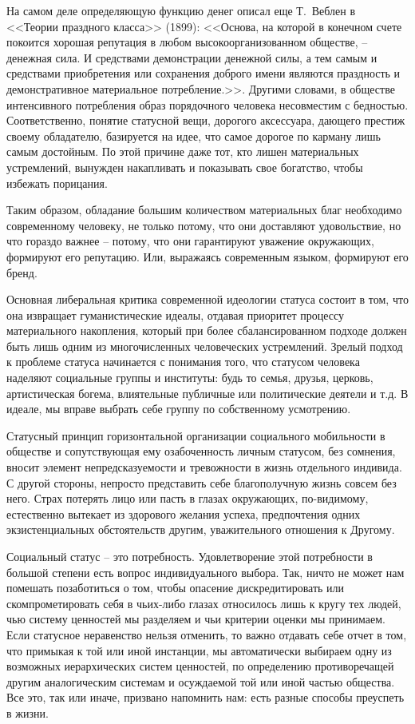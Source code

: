 На самом деле определяющую функцию денег описал еще Т.~Веблен в <<Теории
праздного класса>> (1899): <<Основа, на которой в конечном счете покоится
хорошая репутация в любом высокоорганизованном обществе, -- денежная сила.
И средствами демонстрации денежной силы, а тем самым и средствами приобретения
или сохранения доброго имени являются праздность и демонстративное материальное
потребление.>>\autocite[][120]{veblen1984teoria}.  Другими словами, в обществе
интенсивного потребления образ порядочного человека несовместим с бедностью.
Соответственно, понятие статусной вещи, дорогого аксессуара, дающего престиж
своему обладателю, базируется на идее, что самое дорогое по карману лишь самым
достойным. По этой причине даже тот, кто лишен материальных устремлений, вынужден
накапливать и показывать свое богатство, чтобы избежать порицания.

Таким образом, обладание большим количеством материальных благ необходимо
современному человеку, не только потому, что они доставляют удовольствие, но что
гораздо важнее -- потому, что они гарантируют уважение окружающих, формируют его
репутацию. Или, выражаясь современным языком, формируют его бренд.

Основная либеральная критика современной идеологии  статуса состоит в том, что
она извращает гуманистические идеалы, отдавая приоритет процессу материального
накопления, который при более сбалансированном подходе должен быть лишь одним
из многочисленных человеческих устремлений. Зрелый подход к проблеме статуса
начинается с понимания того, что статусом человека наделяют социальные группы и
институты: будь то семья, друзья, церковь, артистическая богема, влиятельные
публичные или политические деятели и т.д. В идеале, мы вправе выбрать себе
группу по собственному усмотрению.

Статусный принцип горизонтальной организации социального мобильности в обществе
и сопутствующая ему озабоченность личным статусом, без сомнения, вносит элемент
непредсказуемости и тревожности в жизнь отдельного индивида. С другой стороны,
непросто представить себе благополучную жизнь совсем без него. Страх потерять
лицо или пасть в глазах окружающих, по-видимому, естественно вытекает из здорового
желания успеха, предпочтения одних экзистенциальных обстоятельств другим,
уважительного отношения к Другому.

Социальный статус -- это потребность. Удовлетворение этой потребности в большой
степени есть вопрос индивидуального выбора. Так, ничто не может нам помешать
позаботиться о том, чтобы опасение дискредитировать или скомпрометировать себя в
чьих-либо глазах относилось лишь к кругу тех людей, чью систему ценностей мы
разделяем и чьи критерии оценки мы принимаем. Если статусное неравенство нельзя
отменить, то важно отдавать себе отчет в том, что примыкая к той или иной
инстанции, мы автоматически выбираем одну из возможных иерархических систем
ценностей, по определению противоречащей другим аналогическим системам и
осуждаемой той или иной частью общества. Все это, так или иначе, призвано
напомнить нам: есть разные способы преуспеть в жизни.

